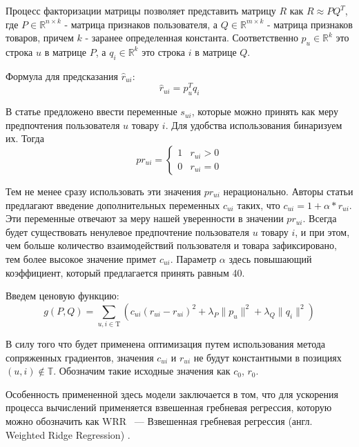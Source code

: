 \documentclass[14pt]{mmcs_article}
\begin{document}
Процесс факторизации матрицы позволяет представить матрицу $R$ как $R \approx P Q^T$, где $P \in  \mathbb {R}^{n\times k}$ - матрица признаков пользователя, а  $Q \in  \mathbb {R}^{m\times k}$ - матрица признаков товаров, причем $k$ - заранее определенная константа. 
Соответственно $p_u \in \mathbb {R}^{k}$ это строка $u$ в матрице $P$, а $q_i \in \mathbb {R}^{k}$ это строка $i$ в матрице $Q$. 

Формула для предсказания  $\hat{r}_{ui}$:
\begin{equation}
	 \hat{r}_{ui} = p_u^T q_i
\end{equation}

В статье \cite{ALS:CFIFD} предложено ввести переменные $s_{ui}$, которые можно принять как меру предпочтения пользователя $u$ товару $i$. Для удобства использования бинаризуем их. Тогда
\begin{equation}
	pr_{ui} = \begin{cases}
		1 & r_{ui} > 0 \\
		0 & r_{ui} = 0
	\end{cases}
\end{equation}

Тем не менее сразу использовать эти значения $pr_{ui}$ нерационально. Авторы статьи \cite{ALS:CFIFD} предлагают введение дополнительных переменных $c_{ui}$ таких, что $c_{ui} = 1 + \alpha * r_{ui}$. Эти переменные отвечают за меру нашей уверенности в значении $pr_{ui}$.  Всегда будет существовать ненулевое предпочтение пользователя $u$ товару $i$, и при этом, чем больше количество взаимодействий пользователя и товара зафиксировано, тем более высокое значение примет $c_{ui}$. Параметр $\alpha$ здесь повышающий коэффициент, который предлагается принять равным 40. 


Введем ценовую функцию:
\begin{equation}
	g(P, Q) = \sum_{u, i \in \mathrm{T}} (c_{ui}(\hat{r}_{ui} - r_{ui})^2 + \lambda_P\parallel p_u \parallel^2 + \lambda_Q\parallel q_i \parallel^2) 
\end{equation}

В силу того что будет применена оптимизация путем использования метода сопряженных градиентов, значения $c_{ui}$ и $r_{ui}$ не будут константными в позициях $(u,i) \not\in \mathbb{T}$. Обозначим такие исходные значения как $c_0$, $r_0$.

Особенность примененной здесь модели заключается в том, что для ускорения процесса вычислений применяется взвешенная гребневая регрессия, которую можно обозначить как WRR ~--- Взвешенная гребневая регрессия (англ. Weighted Ridge Regression) \cite{implicit:all}.
\end{document}
